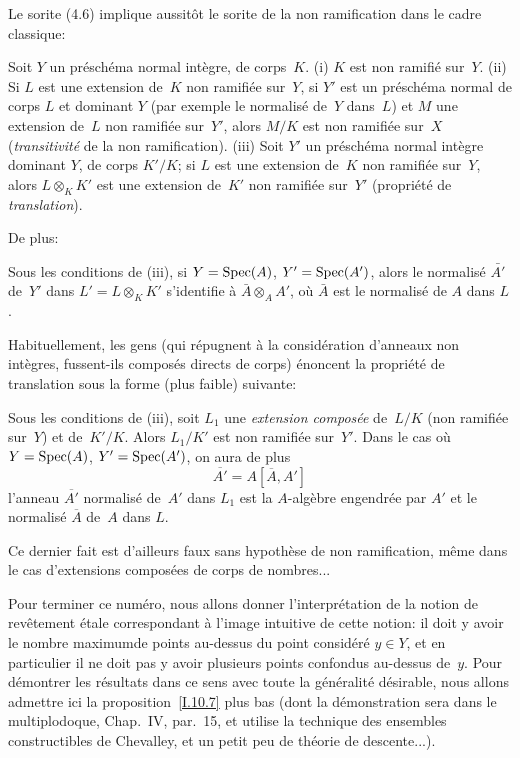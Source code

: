 Le sorite (4.6) implique aussit\^ot le sorite de la non ramification
dans le cadre classique:

\begin{proposition}
\label{I.10.4}
Soit
$Y$ un pr\'esch\'ema normal int\`egre, de corps~$K$.
\textup{(i)} $K$ est non ramifi\'e
sur~$Y$.
\textup{(ii)} Si $L$ est une extension de~$K$ non ramifi\'ee sur~$Y$, si $Y'$
est un pr\'esch\'ema normal de corps $L$ et dominant $Y$ (par
exemple le normalis\'e de~$Y$ dans~$L$) et $M$ une extension de~$L$
non ramifi\'ee sur~$Y'$, alors $M/K$ est non ramifi\'ee sur~$X$
(\emph{transitivité} de la non ramification). \textup{(iii)} Soit $Y'$ un
pr\'esch\'ema normal int\`egre dominant $Y$, de corps $K'/K$; si
$L$ est une extension de~$K$ non ramifi\'ee sur~$Y$, alors
$L\otimes_K K'$ est une extension de~$K'$ non ramifi\'ee sur~$Y'$
(propri\'et\'e de \emph{translation}).
\end{proposition}

De
plus:

\begin{corollaire}
\label{I.10.5}
Sous les conditions de \textup{(iii)}, si $Y=\operatorname{Spec}(A)$, $Y'=\operatorname{Spec}(A')$, alors
le normalis\'e
$\bar{A'}$
de~$Y'$ dans $L'=L\otimes_K K'$ s'identifie
\`a $\bar{A}\otimes_A A'$, o\`u $\bar{A}$ est le normalis\'e de
$A$ dans $L$.
\end{corollaire}

Habituellement, les gens (qui r\'epugnent \`a la consid\'eration
d'anneaux non int\`egres, fussent-ils compos\'es directs de corps)
\'enoncent la propri\'et\'e de translation sous la forme (plus
faible) suivante:

\begin{corollaire}
\label{I.10.6}
Sous les conditions de \textup{(iii)}, soit $L_1$ une \emph{extension
composée} de~$L/K$ (non ramifi\'ee sur~$Y$) et de~$K'/K$. Alors
$L_1/K'$ est non ramifi\'ee sur~$Y'$. Dans le cas o\`u
$Y=\operatorname{Spec}(A)$, $Y'=\operatorname{Spec}(A')$, on aura de plus
$$
\overline{A'}=A[\overline{A},A']
$$
\ie l'anneau $\overline{A'}$ normalis\'e de~$A'$ dans $L_1$ est la
$A$-alg\`ebre engendr\'ee par $A'$ et le normalis\'e
$\overline{A}$ de~$A$ dans $L$.
\end{corollaire}

Ce dernier fait est d'ailleurs faux sans hypoth\`ese de non
ramification, m\^eme dans le cas d'extensions compos\'ees de corps
de nombres...

Pour terminer ce num\'ero, nous allons donner l'interpr\'etation
de la notion de rev\^etement \'etale correspondant \`a l'image
intuitive de cette notion: il doit y avoir le \og nombre maximum\fg de
points au-dessus du point consid\'er\'e $y\in Y$, et en
particulier il ne doit pas y avoir \og plusieurs points confondus\fg
au-dessus de~$y$. Pour d\'emontrer les r\'esultats dans ce sens
avec toute la g\'en\'eralit\'e d\'esirable, nous allons
admettre ici la proposition~\ref{I.10.7} plus bas (dont la d\'emonstration
sera dans le multiplodoque, Chap.\, IV, par.\, 15, et utilise la technique
des ensembles constructibles de Chevalley, et un petit peu de
th\'eorie de descente...).

